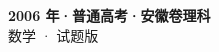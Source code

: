 \documentclass[zihao=-4, a4paper]{ctexart}
\begin{document}
\begin{center}
  {\Large\bfseries 2006 年·普通高考·安徽卷理科}\\[4pt]
  {\large 数学 · 试题版}
\end{center}
\medskip
{}

\end{document}

